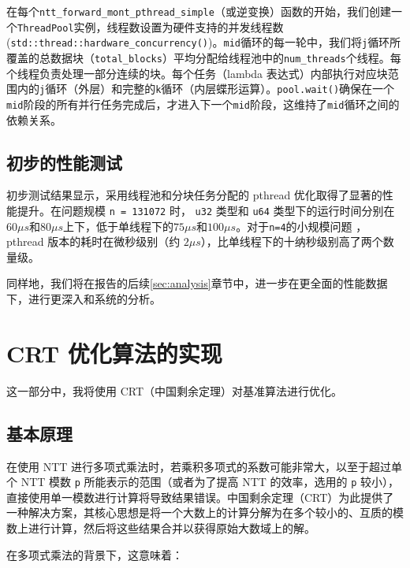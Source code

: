 \documentclass[a4paper]{article}
\begin{document}
在每个\texttt{ntt\_forward\_mont\_pthread\_simple}（或逆变换）函数的开始，我们创建一个\texttt{ThreadPool}实例，线程数设置为硬件支持的并发线程数 (\texttt{std::thread::hardware\_concurrency()})。\texttt{mid}循环的每一轮中，我们将\texttt{j}循环所覆盖的总数据块（\texttt{total\_blocks}）平均分配给线程池中的\texttt{num\_threads}个线程。每个线程负责处理一部分连续的块。每个任务（lambda 表达式）内部执行对应块范围内的\texttt{j}循环（外层）和完整的\texttt{k}循环（内层蝶形运算）。\texttt{pool.wait()}确保在一个\texttt{mid}阶段的所有并行任务完成后，才进入下一个\texttt{mid}阶段，这维持了\texttt{mid}循环之间的依赖关系。

\subsection{初步的性能测试}

初步测试结果显示，采用线程池和分块任务分配的 pthread 优化取得了显著的性能提升。在问题规模 \texttt{n = 131072} 时， \texttt{u32} 类型和 \texttt{u64} 类型下的运行时间分别在$60\mu s$和$80 \mu s$上下，低于单线程下的$75\mu s$和$100 \mu s$。对于\texttt{n=4}的小规模问题 ，pthread 版本的耗时在微秒级别（约 $2 \mu s$），比单线程下的十纳秒级别高了两个数量级。

同样地，我们将在报告的后续\ref{sec:analysis}章节中，进一步在更全面的性能数据下，进行更深入和系统的分析。

\section{CRT 优化算法的实现}

这一部分中，我将使用 CRT（中国剩余定理）对基准算法进行优化。

\subsection{基本原理}

在使用 NTT 进行多项式乘法时，若乘积多项式的系数可能非常大，以至于超过单个 NTT 模数 \texttt{p} 所能表示的范围（或者为了提高 NTT 的效率，选用的 \texttt{p} 较小），直接使用单一模数进行计算将导致结果错误。中国剩余定理（CRT）为此提供了一种解决方案，其核心思想是将一个大数上的计算分解为在多个较小的、互质的模数上进行计算，然后将这些结果合并以获得原始大数域上的解。

在多项式乘法的背景下，这意味着：
\end{document}
